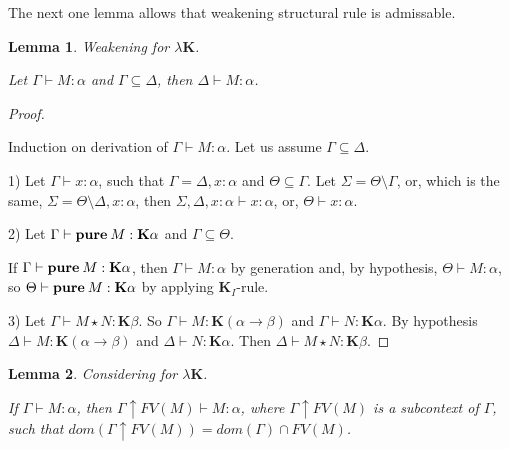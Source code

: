 \documentclass[a4paper]{article}
\newtheorem{lemma}{Lemma}
\begin{document}
  \vspace{\baselineskip}

  The next one lemma allows that weakening structural rule is admissable.

  \begin{lemma} Weakening for $\lambda \textbf{K}$.

  Let $\Gamma \vdash M : \alpha$ and $\Gamma \subseteq \Delta$, then $\Delta \vdash M : \alpha$.

  \end{lemma}

  \begin{proof}

  $ $

  Induction on derivation of $\Gamma \vdash M : \alpha$. Let us assume $\Gamma \subseteq \Delta$.

  1) Let $\Gamma \vdash x : \alpha$, such that $\Gamma = \Delta, x : \alpha$ and $\Theta \subseteq \Gamma$.
  Let $\Sigma = \Theta \setminus \Gamma$, or, which is the same, $\Sigma = \Theta \setminus \Delta, x :
  \alpha$, then $\Sigma,
  \Delta, x : \alpha \vdash x : \alpha$, or, $\Theta \vdash x : \alpha$.

  2) Let $\Gamma \vdash {\bf pure \: } M : \textbf{K}\alpha$ and $\Gamma \subseteq \Theta$.

  If $\Gamma \vdash {\bf pure \: } M : \textbf{K}\alpha$, then $\Gamma \vdash M : \alpha$ by generation and, by
  hypothesis, $\Theta \vdash M : \alpha$, so $\Theta \vdash {\bf pure \: } M : \textbf{K}\alpha$ by applying
  $\textbf{K}_I$-rule.

  3) Let $\Gamma \vdash M \star N : \textbf{K}\beta$. So $\Gamma \vdash M : \textbf{K}(\alpha \to \beta)$ and $\Gamma
  \vdash N : \textbf{K}\alpha$. By hypothesis $\Delta \vdash M : \textbf{K}(\alpha \to \beta)$ and $\Delta \vdash N :
  \textbf{K}\alpha$. Then $\Delta \vdash M \star N : \textbf{K}\beta$.

  \end{proof}

  \begin{lemma} Considering for $\lambda \textbf{K}$.

  If $\Gamma \vdash M : \alpha$, then $\Gamma \uparrow FV(M) \vdash M : \alpha$, where $\Gamma \uparrow
  FV(M)$ is a subcontext of $\Gamma$, such that $dom(\Gamma \uparrow FV(M)) = dom(\Gamma) \cap FV(M)$.

  \end{lemma}
\end{document}
